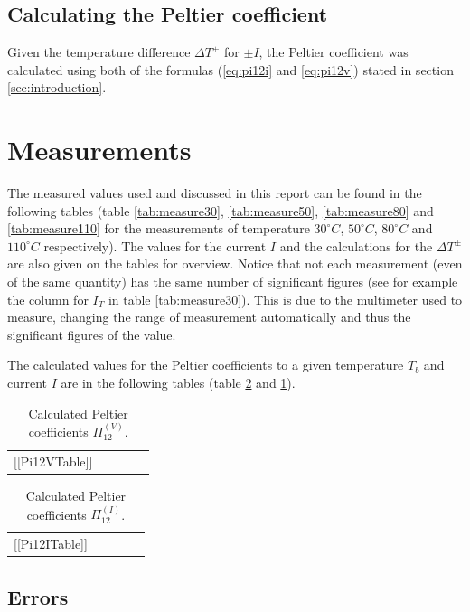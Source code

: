 \documentclass[a4paper]{article}
\begin{document}
\subsection{Calculating the Peltier coefficient}

Given the temperature difference $\Delta T^{\pm}$ for $\pm I$, the Peltier coefficient was calculated using both of the formulas (\eqref{eq:pi12i} and \eqref{eq:pi12v}) stated in section \ref{sec:introduction}.

\newpage
\section{Measurements}

The measured values used and discussed in this report can be found in the following tables (table \ref{tab:measure30}, \ref{tab:measure50}, \ref{tab:measure80} and \ref{tab:measure110} for the measurements of temperature $30^{\circ}C$, $50^{\circ}C$, $80^{\circ}C$ and $110^{\circ}C$ respectively). The values for the current $I$ and the calculations for the $\Delta T^{\pm}$ are also given on the tables for overview. Notice that not each measurement (even of the same quantity) has the same number of significant figures (see for example the column for $I_T$ in table \ref{tab:measure30}). This is due to the multimeter used to measure, changing the range of measurement automatically and thus the significant figures of the value.

The calculated values for the Peltier coefficients to a given temperature $T_b$ and current $I$ are in the following tables (table \ref{tab:pi12i} and \ref{tab:pi12v}).

\begin{table}[H]
\centering
\begin{tabular}{r|rrrr}
[[Pi12VTable]]
\end{tabular}
\caption{Calculated Peltier coefficients $\Pi_{12}^{(V)}$.}
\label{tab:pi12v}
\end{table}

\begin{table}[H]
\centering
\begin{tabular}{r|rrrr}
[[Pi12ITable]]
\end{tabular}
\caption{Calculated Peltier coefficients $\Pi_{12}^{(I)}$.}
\label{tab:pi12i}
\end{table}

\subsection{Errors}
\end{document}
